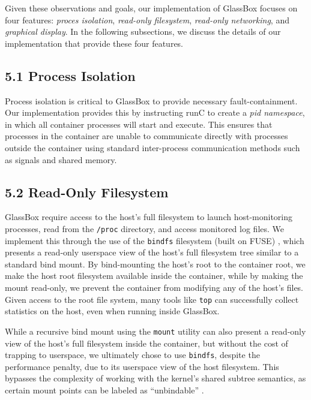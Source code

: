 \documentclass{proc}
\begin{document}
Given these observations and goals, our implementation of GlassBox focuses on four features: \textit{proces isolation}, \textit{read-only filesystem}, \textit{read-only networking}, and \textit{graphical display}. In the following subsections, we discuss the details of our implementation that provide these four features.

\subsection*{5.1 Process Isolation}

Process isolation is critical to GlassBox to provide necessary fault-containment. Our implementation provides this by instructing runC to create a \textit{pid namespace}, in which all container processes will start and execute. This ensures that processes in the container are unable to communicate directly with processes outside the container using standard inter-process communication methods such as signals and shared memory.

\subsection*{5.2 Read-Only Filesystem}

GlassBox require access to the host's full filesystem to launch host-monitoring processes, read from the \texttt{/proc} directory, and access monitored log files. We implement this through the use of the \texttt{bindfs} filesystem (built on FUSE) \cite{bindfs}, which presents a read-only userspace view of the host's full filesystem tree similar to a standard bind mount. By bind-mounting the host's root to the container root, we make the host root filesystem available inside the container, while by making the mount read-only, we prevent the container from modifying any of the host's files. Given access to the root file system, many tools like \texttt{top} can successfully collect statistics on the host, even when running inside GlassBox.

While a recursive bind mount using the \texttt{mount} utility can also present a read-only view of the host's full filesystem inside the container, but without the cost of trapping to userspace, we ultimately chose to use \texttt{bindfs}, despite the performance penalty, due to its userspace view of the host filesystem. This bypasses the complexity of working with the kernel's shared subtree semantics, as certain mount points can be labeled as ``unbindable'' \cite{mountman}.
\end{document}
